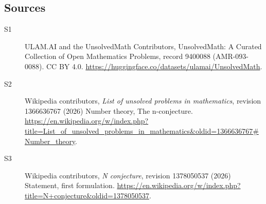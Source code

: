\documentclass[11pt]{article}
\begin{document}
\subsection{Sources}
\begin{description}
\item[\hypertarget{source:9400088:1}{S1}] ULAM.AI and the UnsolvedMath Contributors, UnsolvedMath: A Curated Collection of Open Mathematics Problems, record 9400088 (AMR-093-0088). CC BY 4.0. \url{https://huggingface.co/datasets/ulamai/UnsolvedMath}.
\item[\hypertarget{source:9400088:2}{S2}] Wikipedia contributors, \emph{List of unsolved problems in mathematics}, revision 1366636767 (2026) Number theory, The n-conjecture. \url{https://en.wikipedia.org/w/index.php?title=List_of_unsolved_problems_in_mathematics&oldid=1366636767#Number_theory}.
\item[\hypertarget{source:9400088:3}{S3}] Wikipedia contributors, \emph{N conjecture}, revision 1378050537 (2026) Statement, first formulation. \url{https://en.wikipedia.org/w/index.php?title=N+conjecture&oldid=1378050537}.
\end{description}
\label{end:9400088}
\end{document}
